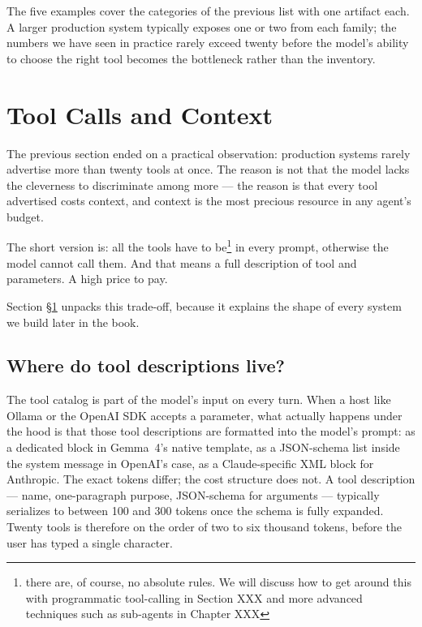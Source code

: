 The five examples cover the categories of the previous list with one
artifact each. A larger production system typically exposes one or
two from each family; the numbers we have seen in practice rarely
exceed twenty before the model's ability to choose the right tool
becomes the bottleneck rather than the inventory.

\section{Tool Calls and Context}
\label{sec:context}

The previous section ended on a practical observation: production
systems rarely advertise more than twenty tools at once. The reason
is not that the model lacks the cleverness to discriminate among
more --- the reason is that every tool advertised costs context, and
context is the most precious resource in any agent's budget. 

The short version is: all the tools have to be\footnote{there are, of course, 
no absolute rules. We will discuss how to get around this with programmatic
tool-calling in Section XXX and more advanced techniques such as sub-agents in Chapter XXX}
in every prompt, otherwise the model cannot call them. And that means a full
description of tool and parameters. A high price to pay.

Section
\S\ref{sec:context} unpacks this trade-off, because it explains the
shape of every system we build later in the book.

\subsection{Where do tool descriptions live?}
\label{sec:context-prompt}

The tool catalog is part of the model's input on every turn. When
a host like Ollama or the OpenAI SDK accepts a 
parameter, what actually happens under the hood is that those tool
descriptions are formatted into the model's prompt: as a dedicated
 block in Gemma~4's native template,
as a JSON-schema list inside the system message in OpenAI's case,
as a Claude-specific XML block for Anthropic. The exact tokens
differ; the cost structure does not. A tool description --- name,
one-paragraph purpose, JSON-schema for arguments --- typically
serializes to between 100 and 300 tokens once the schema is
fully expanded. Twenty tools is therefore on the order of two to
six thousand tokens, before the user has typed a single character.

